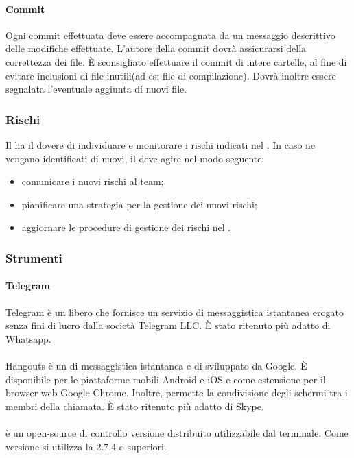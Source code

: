  \paragraph{Commit}
 Ogni commit effettuata deve essere accompagnata da un messaggio descrittivo delle modifiche effettuate. L'autore della commit dovrà assicurarsi della correttezza dei file. È sconsigliato effettuare il commit di intere cartelle, al fine di evitare inclusioni di file inutili(ad es: file di compilazione).
 Dovrà inoltre essere segnalata l'eventuale aggiunta di nuovi file.
 \subsubsection{Rischi}
 Il \RESP{} ha il dovere di individuare e monitorare i rischi indicati nel \PPdoc. In caso ne vengano identificati di nuovi, il \RESP{} deve agire nel modo seguente:
 \begin{itemize}
  \item comunicare i nuovi rischi al team;
  \item pianificare una strategia per la gestione dei nuovi rischi;
  \item aggiornare le procedure di gestione dei rischi nel \PPdoc.
 \end{itemize}
\subsubsection{Strumenti}
 \paragraph{Telegram}
 Telegram è un  libero che fornisce un servizio di messaggistica istantanea erogato senza fini di lucro dalla società Telegram LLC. È stato ritenuto più adatto di Whatsapp.
 \paragraph{}
 Hangouts è un  di messaggistica istantanea e di    sviluppato da Google. È disponibile per le piattaforme mobili Android e iOS e come estensione per il browser web Google Chrome. Inoltre, permette la condivisione degli schermi tra i membri della chiamata. È stato ritenuto più adatto di Skype.
 \paragraph{}
  è un  open-source di controllo versione distribuito utilizzabile dal terminale. Come versione si utilizza la 2.7.4 o superiori.
